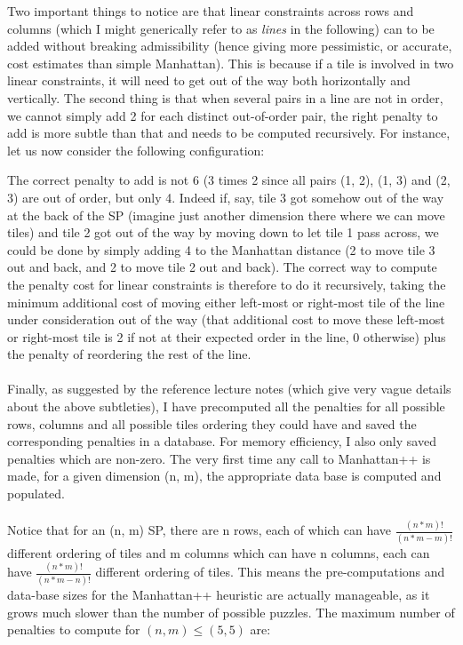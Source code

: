 \begin{itemize}
Two important things to notice are that linear constraints across rows and columns (which I might generically refer to as \textit{lines} in the following) can to be added without breaking admissibility (hence giving more pessimistic, or accurate, cost estimates than simple Manhattan). This is because if a tile is involved in two linear constraints, it will need to get out of the way both horizontally and vertically. The second thing is that when several pairs in a line are not in order, we cannot simply add 2 for each distinct out-of-order pair, the right penalty to add is more subtle than that and needs to be computed recursively. For instance, let us now consider the following configuration:
\begin{center}
\begin{five}
\end{five}
\end{center}
The correct penalty to add is not 6 (3 times 2 since all pairs (1, 2), (1, 3) and (2, 3) are out of order, but only 4. Indeed if, say, tile 3 got somehow out of the way at the back of the SP (imagine just another dimension there where we can move tiles) and tile 2 got out of the way by moving down to let tile 1 pass across, we could be done by simply adding 4 to the Manhattan distance (2 to move tile 3 out and back, and 2 to move tile 2 out and back). The correct way to compute the penalty cost for linear constraints is therefore to do it recursively, taking the minimum additional cost of moving either left-most or right-most tile of the line under consideration out of the way (that additional cost to move these left-most or right-most tile is 2 if not at their expected order in the line, 0 otherwise) plus the penalty of reordering the rest of the line.
\\
\\
Finally, as suggested by the reference lecture notes (which give very vague details about the above subtleties), I have precomputed all the penalties for all possible rows, columns and all possible tiles ordering they could have and saved the corresponding penalties in a database. For memory efficiency, I also only saved penalties which are non-zero. The very first time any call to Manhattan++ is made, for a given dimension (n, m), the appropriate data base is computed and populated.
\\
\\
Notice that for an (n, m) SP, there are n rows, each of which can have $\frac{(n * m)!}{(n * m - m)!}$ different ordering of tiles and m columns which can have n columns, each can have $\frac{(n * m)!}{(n * m - n)!}$ different ordering of tiles. This means the pre-computations and data-base sizes for the Manhattan++ heuristic are actually manageable, as it grows much slower than the number of possible puzzles. The maximum number of penalties to compute for $(n, m) \leq (5, 5)$ are:



\end{itemize}
